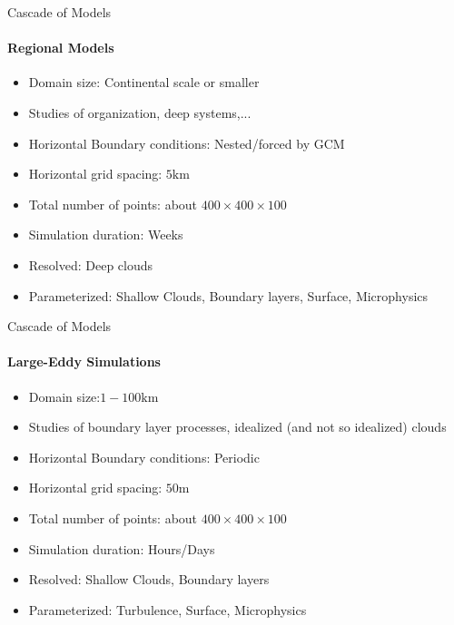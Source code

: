\begin{frame}{Cascade of Models}
\framesubtitle{Regional Models}
\begin{itemize}
 \item Domain size: Continental scale or smaller
 \item Studies of organization, deep systems,...
 \item Horizontal Boundary conditions: Nested/forced by GCM
 \item Horizontal grid spacing: $5 \mathrm{km}$
 \item Total number of points: about $400 \times 400 \times 100 $
 \item Simulation duration: Weeks
 \item Resolved: Deep clouds
 \item Parameterized: Shallow Clouds,  Boundary layers, Surface, Microphysics
\end{itemize}
 
\end{frame}
\begin{frame}{Cascade of Models}
\framesubtitle{Large-Eddy Simulations}
\begin{itemize}
 \item Domain size:$1 - 100\mathrm{km}$
 \item Studies of boundary layer processes, idealized (and not so idealized) clouds
 \item Horizontal Boundary conditions: Periodic
 \item Horizontal grid spacing: $50 \mathrm{m}$
 \item Total number of points: about $400 \times 400 \times 100 $
 \item Simulation duration: Hours/Days
 \item Resolved: Shallow Clouds,  Boundary layers
 \item Parameterized: Turbulence, Surface, Microphysics
\end{itemize}
 
\end{frame}

